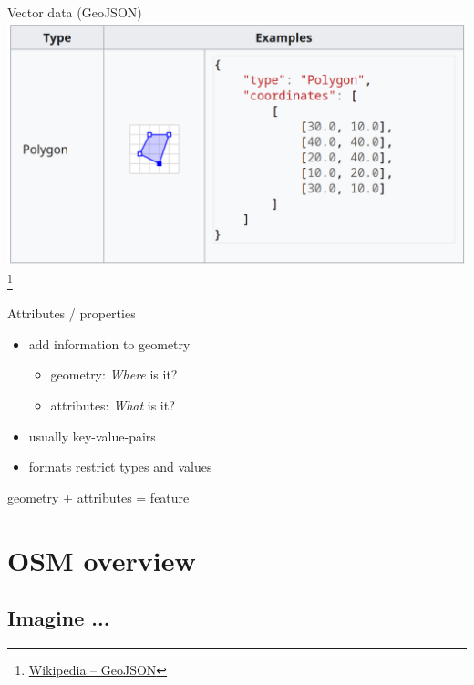 \documentclass{beamer}
\begin{document}
		\begin{frame}{Vector data (GeoJSON)}
			\includegraphics[width=\textwidth]{images/geodata-vector-2.png}\footnote{\href{https://en.wikipedia.org/wiki/GeoJSON}{Wikipedia -- GeoJSON}}
		\end{frame}
		
		\begin{frame}{Attributes / properties}
			\begin{itemize}
				\item add information to geometry
				\begin{itemize}
					\item geometry: \textit{Where} is it?
					\item attributes: \textit{What} is it?
				\end{itemize}\pause
				\item usually key-value-pairs\pause
				\item formats restrict types and values
			\end{itemize}
			\pause
			\vspace{0.5cm}
			\begin{center}
				geometry + attributes = feature
			\end{center}
		\end{frame}
		
	\section{OSM overview}
	
		\begin{frame}
			\tableofcontents[currentsection]
		\end{frame}
	
		\subsection{Imagine ...}
			
\end{document}
